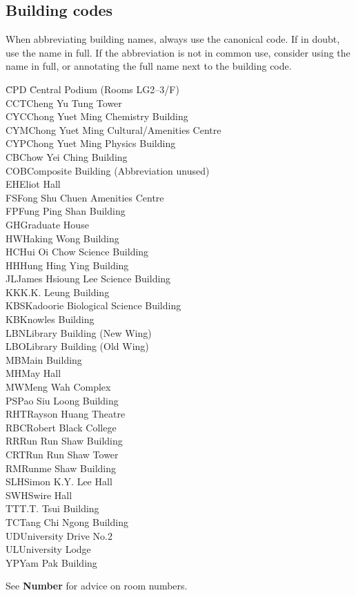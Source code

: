 \documentclass[11pt,a4paper]{book}
\begin{document}
	\subsection{Building codes}
	When abbreviating building names, always use the canonical code. If in doubt, use the name in full. If the abbreviation is not in common use, consider using the name in full, or annotating the full name next to the building code.
	{\firasans\begin{tabbing}
		\hspace{1em}\=CPD \hspace{2em}\=Central Podium (Rooms LG2--3/F)\\
		\>CCT\>Cheng Yu Tung Tower\\
		\>CYC\>Chong Yuet Ming Chemistry Building\\
		\>CYM\>Chong Yuet Ming Cultural/Amenities Centre\\
		\>CYP\>Chong Yuet Ming Physics Building\\
		\>CB\>Chow Yei Ching Building\\
		\>COB\>Composite Building (Abbreviation unused)\\
		\>EH\>Eliot Hall\\
		\>FS\>Fong Shu Chuen Amenities Centre\\
		\>FP\>Fung Ping Shan Building\\
		\>GH\>Graduate House\\
		\>HW\>Haking Wong Building\\
		\>HC\>Hui Oi Chow Science Building\\
		\>HH\>Hung Hing Ying Building\\
		\>JL\>James Hsioung Lee Science Building\\
		\>KK\>K.K. Leung Building\\
		\>KBS\>Kadoorie Biological Science Building\\
		\>KB\>Knowles Building\\
		\>LBN\>Library Building (New Wing)\\
		\>LBO\>Library Building (Old Wing)\\
		\>MB\>Main Building\\
		\>MH\>May Hall\\
		\>MW\>Meng Wah Complex\\
		\>PS\>Pao Siu Loong Building\\
		\>RHT\>Rayson Huang Theatre\\
		\>RBC\>Robert Black College\\
		\>RR\>Run Run Shaw Building\\
		\>CRT\>Run Run Shaw Tower\\
		\>RM\>Runme Shaw Building\\
		\>SLH\>Simon K.Y. Lee Hall\\
		\>SWH\>Swire Hall\\
		\>TT\>T.T. Tsui Building\\
		\>TC\>Tang Chi Ngong Building\\
		\>UD\>University Drive No.2\\
		\>UL\>University Lodge\\
		\>YP\>Yam Pak Building
	\end{tabbing}}
	See \textbf{Number} for advice on room numbers.
\end{document}
